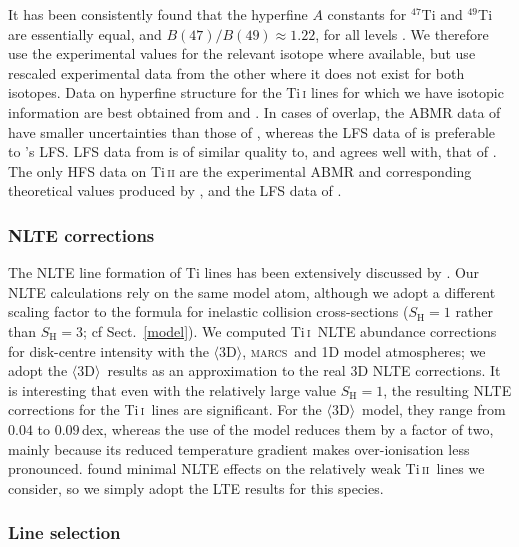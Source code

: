 \documentclass[traditabstract]{aa}
\newcommand{\oneDAV}{$\langle\mathrm{3D}\rangle$}
\newcommand{\marcs}{\textsc{marcs}}
\newcommand{\alttii}{Ti\,\textsc{i}}
\newcommand{\alttiii}{Ti\,\textsc{ii}}
\newcommand{\tii}{\alttii\ }
\newcommand{\tiii}{\alttiii\ }
\begin{document}
It has been consistently found that the hyperfine $A$ constants for $^{47}$Ti and $^{49}$Ti are
essentially equal, and $B(47) / B(49)\approx1.22$, for all levels \citep{Channappa65, Aydin90, Stachowska94, Gangrsky95}.
We therefore use the experimental values for the relevant isotope where available, but use rescaled experimental data from
the other where it does not exist for both isotopes.  Data on hyperfine structure for the Ti\,\textsc{i} lines for which
we have isotopic information are best obtained from \citet{Gangrsky95} and \citet{Aydin90}. In cases of overlap, the ABMR
data of \citeauthor{Aydin90} have smaller uncertainties than those of \citet{Johann81}, whereas the LFS data of
\citeauthor{Gangrsky95} is preferable to \citeauthor{Aydin90}'s LFS. LFS data from \citet{Jin09} is of similar quality to, and agrees well with, that 
of \citet{Gangrsky95}.  The only HFS data on Ti\,\textsc{ii} are the experimental ABMR and corresponding theoretical values produced by \citet{Berrah92}, and the LFS data of \citet{Nouri10}.

\subsubsection{NLTE corrections}
\label{TiNLTE}
The NLTE line formation of Ti lines has been extensively discussed by \citet{Bergemann11}. Our NLTE calculations rely on the same model atom, although we adopt a different scaling factor to the \citet{Drawin69} formula for inelastic  collision cross-sections ($S_\mathrm{H}=1$ rather than $S_\mathrm{H}=3$; cf Sect.\ \ref{model}). We computed \tii NLTE abundance corrections for disk-centre intensity with the \oneDAV, \marcs\ and  1D model atmospheres; we adopt the \oneDAV\ results as an approximation to the real 3D NLTE corrections.  It is interesting that even with the relatively large value $S_\mathrm{H}=1$, the resulting NLTE corrections for the \tii lines are significant. For the \oneDAV\ model, they range from $0.04$ to $0.09$\,dex, whereas the use of the  model reduces them by a factor of two, mainly because its reduced temperature gradient makes over-ionisation less pronounced.  \citet{Bergemann11} found minimal NLTE effects on the relatively weak \tiii lines we consider, so we simply adopt the LTE results for this species.

\subsubsection{Line selection}
\label{Tilineselection}
\end{document}
